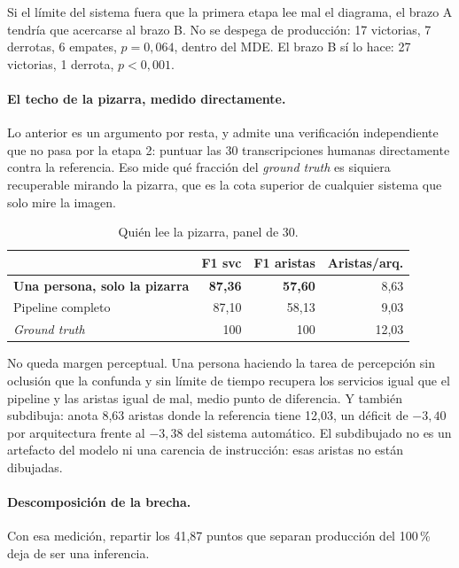 \documentclass[a4paper, twocolumn, 10pt]{IEEEtran}
\begin{document}
Si el límite del sistema fuera que la primera etapa lee mal el diagrama, el brazo A tendría que acercarse al brazo B. No se despega de producción: 17 victorias, 7 derrotas, 6 empates, $p=0{,}064$, dentro del MDE. El brazo B sí lo hace: 27 victorias, 1 derrota, $p<0{,}001$.

\paragraph{El techo de la pizarra, medido directamente.}
Lo anterior es un argumento por resta, y admite una verificación independiente que no pasa por la etapa 2: puntuar las 30 transcripciones humanas directamente contra la referencia. Eso mide qué fracción del \emph{ground truth} es siquiera recuperable mirando la pizarra, que es la cota superior de cualquier sistema que solo mire la imagen.

\begin{table}[H]
\centering\small\setlength{\tabcolsep}{4pt}
\caption{Quién lee la pizarra, panel de 30.}
\label{tab:techo}
\begin{tabular}{lrrr}
\toprule
 & F1 svc & F1 aristas & Aristas/arq.\\
\midrule
\textbf{Una persona, solo la pizarra} & \textbf{87,36} & \textbf{57,60} & 8,63\\
Pipeline completo                     & 87,10 & 58,13 & 9,03\\
\emph{Ground truth}                   & 100   & 100   & 12,03\\
\bottomrule
\end{tabular}
\end{table}

No queda margen perceptual. Una persona haciendo la tarea de percepción sin oclusión que la confunda y sin límite de tiempo recupera los servicios igual que el pipeline y las aristas igual de mal, medio punto de diferencia. Y también subdibuja: anota 8,63 aristas donde la referencia tiene 12,03, un déficit de $-3{,}40$ por arquitectura frente al $-3{,}38$ del sistema automático. El subdibujado no es un artefacto del modelo ni una carencia de instrucción: esas aristas no están dibujadas.

\paragraph{Descomposición de la brecha.}
Con esa medición, repartir los 41,87 puntos que separan producción del 100\,\% deja de ser una inferencia.
\end{document}
